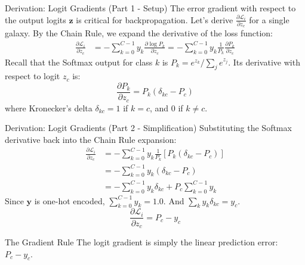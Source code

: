 \documentclass[9pt]{beamer}
\begin{document}
\begin{frame}{Derivation: Logit Gradients (Part 1 - Setup)}
  The error gradient with respect to the output logits $\mathbf{z}$ is critical for backpropagation. Let's derive $\frac{\partial \mathcal{L}_i}{\partial z_c}$ for a single galaxy.
  By the Chain Rule, we expand the derivative of the loss function:
  \begin{align*}
    \frac{\partial \mathcal{L}_i}{\partial z_c} &= - \sum_{k=0}^{C-1} y_k \frac{\partial \log P_k}{\partial z_c} = - \sum_{k=0}^{C-1} y_k \frac{1}{P_k} \frac{\partial P_k}{\partial z_c}
  \end{align*}
  Recall that the Softmax output for class $k$ is $P_k = e^{z_k} / \sum_{j} e^{z_j}$. Its derivative with respect to logit $z_c$ is:
  $$\frac{\partial P_k}{\partial z_c} = P_k (\delta_{kc} - P_c)$$
  where Kronecker's delta $\delta_{kc} = 1$ if $k=c$, and $0$ if $k \neq c$.
\end{frame}

\begin{frame}{Derivation: Logit Gradients (Part 2 - Simplification)}
  Substituting the Softmax derivative back into the Chain Rule expansion:
  \begin{align*}
    \frac{\partial \mathcal{L}_i}{\partial z_c} &= - \sum_{k=0}^{C-1} y_k \frac{1}{P_k} \left[ P_k (\delta_{kc} - P_c) \right] \\
    &= - \sum_{k=0}^{C-1} y_k (\delta_{kc} - P_c) \\
    &= - \sum_{k=0}^{C-1} y_k \delta_{kc} + P_c \sum_{k=0}^{C-1} y_k
  \end{align*}
  Since $\mathbf{y}$ is one-hot encoded, $\sum_{k=0}^{C-1} y_k = 1.0$. And $\sum_{k} y_k \delta_{kc} = y_c$.
  $$\frac{\partial \mathcal{L}_i}{\partial z_c} = P_c - y_c$$
  \begin{alertblock}{The Gradient Rule}
    The logit gradient is simply the linear prediction error: $P_c - y_c$.
  \end{alertblock}
\end{frame}
\end{document}
